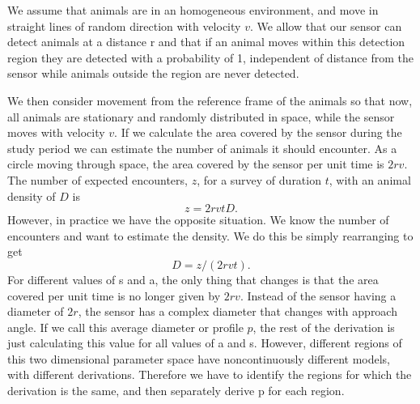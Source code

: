 \documentclass[a4paper,10pt,reqno,oneside]{amsart}
\begin{document}
We assume that animals are in an homogeneous environment, and move in straight lines of random direction with velocity $v$. We allow that our sensor can detect animals at a distance r and that if an animal moves within this detection region they are detected with a probability of 1, independent of distance from the sensor while animals outside the region are never detected.

We then consider movement from the reference frame of the animals so that now, all animals are stationary and randomly distributed in space, while the sensor moves with velocity $v$. If we calculate the area covered by the sensor during the study period we can estimate the number of animals it should encounter. As a circle moving through space, the area covered by the sensor per unit time is $2rv$. The number of expected encounters, $z$, for a survey of duration $t$, with an animal density of $D$ is
\begin{equation}
	z = 2rvtD.
\end{equation}
However, in practice we have the opposite situation. We know the number of encounters and want to estimate the density. We do this be simply rearranging to get
\begin{equation}
	D = z/(2rvt).
\end{equation}
For different values of s and a, the only thing that changes is that the area covered per unit time is no longer given by $2rv$. Instead of the sensor having a diameter of $2r$, the sensor has a complex diameter that changes with approach angle. If we call this average diameter or profile $p$, the rest of the derivation is just calculating this value for all values of a and s. However, different regions of this two dimensional parameter space have noncontinuously different models, with different derivations. Therefore we have to identify the regions for which the derivation is the same, and then separately derive p for each region.
\end{document}
